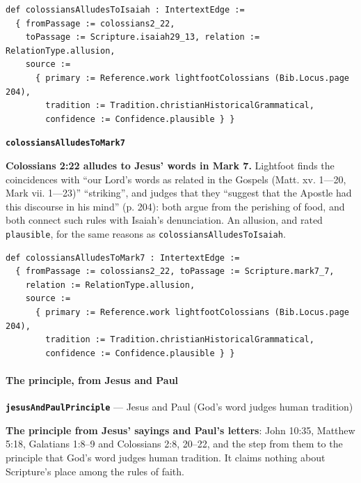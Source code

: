 \documentclass[11pt]{article}
\begin{document}
{\small\begin{verbatim}
def colossiansAlludesToIsaiah : IntertextEdge :=
  { fromPassage := colossians2_22,
    toPassage := Scripture.isaiah29_13, relation := RelationType.allusion,
    source :=
      { primary := Reference.work lightfootColossians (Bib.Locus.page 204),
        tradition := Tradition.christianHistoricalGrammatical,
        confidence := Confidence.plausible } }
\end{verbatim}}
\par\medskip\noindent\textbf{\texttt{colossians\allowbreak{}Alludes\allowbreak{}To\allowbreak{}Mark7}}\par\nobreak\noindent
\textbf{Colossians 2:22 alludes to Jesus’ words in Mark 7.} Lightfoot finds the coincidences with “our Lord’s words as related in the Gospels (Matt. xv. 1—20, Mark vii. 1—23)” “striking”, and judges that they “suggest that the Apostle had this discourse in his mind” (p. 204): both argue from the perishing of food, and both connect such rules with Isaiah’s denunciation. An allusion, and rated \texttt{plausible}, for the same reasons as \texttt{colossians\allowbreak{}Alludes\allowbreak{}To\allowbreak{}Isaiah}.

{\small\begin{verbatim}
def colossiansAlludesToMark7 : IntertextEdge :=
  { fromPassage := colossians2_22, toPassage := Scripture.mark7_7,
    relation := RelationType.allusion,
    source :=
      { primary := Reference.work lightfootColossians (Bib.Locus.page 204),
        tradition := Tradition.christianHistoricalGrammatical,
        confidence := Confidence.plausible } }
\end{verbatim}}
\paragraph*{The principle, from Jesus and Paul}
\leavevmode\par\nobreak
\par\medskip\noindent\textbf{\texttt{jesus\allowbreak{}And\allowbreak{}Paul\allowbreak{}Principle}} --- Jesus and Paul (God’s word judges human tradition)\par\nobreak\noindent
\textbf{The principle from Jesus’ sayings and Paul’s letters}: John 10:35, Matthew 5:18, Galatians 1:8–9 and Colossians 2:8, 20–22, and the step from them to the principle that God’s word judges human tradition. It claims nothing about Scripture’s place among the rules of faith.
\end{document}

